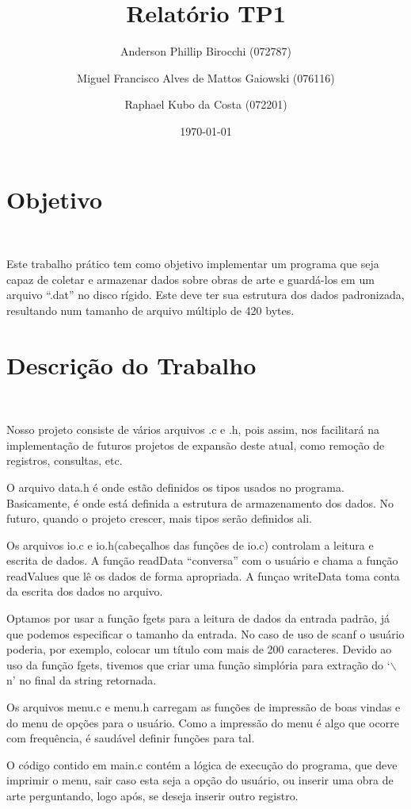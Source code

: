 \documentclass{article}
\title{Relatório TP1}
\author{Anderson Phillip Birocchi (072787) \and
  Miguel Francisco Alves de Mattos Gaiowski (076116) \and
  Raphael Kubo da Costa (072201)}
\date{\today}
\begin{document}
\maketitle

\section*{Objetivo}\

Este trabalho prático tem como objetivo implementar um programa que seja capaz de coletar e armazenar dados sobre obras de arte e guardá-los em um arquivo ``.dat'' no disco rígido. Este deve ter sua estrutura dos dados padronizada, resultando num tamanho de arquivo múltiplo de 420 bytes.

\section*{Descrição do Trabalho}\

Nosso projeto consiste de vários arquivos .c e .h, pois assim, nos facilitará na implementação de futuros projetos de expansão deste atual, como remoção de registros, consultas, etc. 

O arquivo data.h é onde estão definidos os tipos usados no programa. Basicamente, é onde está definida a estrutura de armazenamento dos dados. No futuro, quando o projeto crescer, mais tipos serão definidos ali.

Os arquivos io.c e io.h(cabeçalhos das funções de io.c) controlam a leitura e escrita de dados. A função readData ``conversa'' com o usuário e chama a função readValues que lê os dados de forma apropriada. A funçao writeData toma conta da escrita dos dados no arquivo.

Optamos por usar a função fgets para a leitura de dados da entrada padrão, já que podemos especificar o tamanho da entrada. No caso de uso de scanf o usuário poderia, por exemplo, colocar um título com mais de 200 caracteres. Devido ao uso da função fgets, tivemos que criar uma função simplória para extração do `$\backslash$n' no final da string retornada.

Os arquivos menu.c e menu.h carregam as funções de impressão de boas vindas e do menu de opções para o usuário. Como a impressão do menu é algo que ocorre com frequência, é saudável definir funções para tal.

O código contido em main.c contém a lógica de execução do programa, que deve imprimir o menu, sair caso esta seja a opção do usuário, ou inserir uma obra de arte perguntando, logo após, se deseja inserir outro registro.
\end{document}
